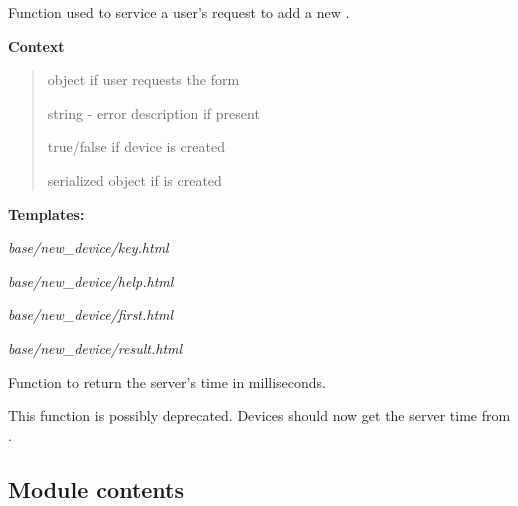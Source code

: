 \documentclass[letterpaper,10pt,english]{sphinxmanual}
\begin{document}
\begin{fulllineitems}
\label{modules/microdata:microdata.views.new_device}
Function used to service a user's request to add a new {\hyperref[modules/microdata:microdata.models.Device]{\emph{}}}.

\textbf{Context}
\begin{quote}

{\hyperref[modules/microdata:microdata.views.KeyForm]{\emph{}}} object if user requests the form

string - error description if present

true/false if device is created

serialized {\hyperref[modules/microdata:microdata.models.Device]{\emph{}}} object if {\hyperref[modules/microdata:microdata.models.Device]{\emph{}}} is created
\end{quote}

\textbf{Templates:}

\emph{base/new\_device/key.html}

\emph{base/new\_device/help.html}

\emph{base/new\_device/first.html}

\emph{base/new\_device/result.html}

\end{fulllineitems}


\begin{fulllineitems}
\label{modules/microdata:microdata.views.timestamp}
Function to return the server's time in milliseconds.

This function is possibly deprecated. Devices should now get the server time
from .

\end{fulllineitems}



\subsection{Module contents}
\label{modules/microdata:module-contents}\label{modules/microdata:module-microdata}
\end{document}
